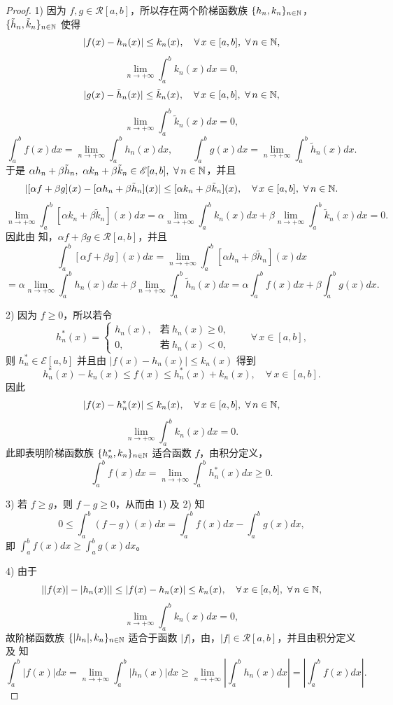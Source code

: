 \begin{proof}

	1) 因为 \(f,g\in\mathscr{R}[a,b]\)，所以存在两个阶梯函数族 \(\{h_n,k_n\}_{n\in\mathbb{N}}\)，\(\{\tilde h_n,\tilde k_n\}_{n\in\mathbb{N}}\) 使得
	\[
	|f(x)-h_n(x)|\le k_n(x),\quad\forall\,x\in[a,b],\ \forall\,n\in\mathbb{N},
	\]
	\[
	\lim_{n\to+\infty}\int_a^b k_n(x)dx=0,
	\]
	\[
	|g(x)-\tilde h_n(x)|\le\tilde k_n(x),\quad\forall\,x\in[a,b],\ \forall\,n\in\mathbb{N},
	\]
	\[
	\lim_{n\to+\infty}\int_a^b\tilde k_n(x)dx=0,
	\]
	\[
	\int_a^b f(x)dx=\lim_{n\to+\infty}\int_a^b h_n(x)dx,\qquad
	\int_a^b g(x)dx=\lim_{n\to+\infty}\int_a^b\tilde h_n(x)dx.
	\]
	于是 \(\alpha h_n+\beta\tilde h_n,\ \alpha k_n+\beta\tilde k_n\in\mathscr{E}[a,b],\ \forall\,n\in\mathbb{N}\)，并且
	\[
	|[\alpha f+\beta g](x)-[\alpha h_n+\beta\tilde h_n](x)|\le[\alpha k_n+\beta\tilde k_n](x),\quad\forall\,x\in[a,b],\ \forall\,n\in\mathbb{N}.
	\]
	\[
	\lim_{n\to+\infty}\int_a^b[\alpha k_n+\beta\tilde k_n](x)dx=\alpha\lim_{n\to+\infty}\int_a^b k_n(x)dx+\beta\lim_{n\to+\infty}\int_a^b\tilde k_n(x)dx=0.
	\]
	因此由 知，\(\alpha f+\beta g\in\mathscr{R}[a,b]\)，并且
	\[
	\int_a^b[\alpha f+\beta g](x)dx=\lim_{n\to+\infty}\int_a^b[\alpha h_n+\beta\tilde h_n](x)dx
	\]
	\[
	=\alpha\lim_{n\to+\infty}\int_a^b h_n(x)dx+\beta\lim_{n\to+\infty}\int_a^b\tilde h_n(x)dx=\alpha\int_a^b f(x)dx+\beta\int_a^b g(x)dx.
	\]

	2) 因为 \(f\ge0\)，所以若令
	\[
	h_n^*(x)=\begin{cases} h_n(x), & \text{若}\ h_n(x)\ge0, \\ 0, & \text{若}\ h_n(x)<0, \end{cases}\qquad\forall\,x\in[a,b],
	\]
	则 \(h_n^*\in\mathscr{E}[a,b]\) 并且由 \(|f(x)-h_n(x)|\le k_n(x)\) 得到
	\[
	h_n^*(x)-k_n(x)\le f(x)\le h_n^*(x)+k_n(x),\quad\forall\,x\in[a,b].
	\]
	因此
	\[
	|f(x)-h_n^*(x)|\le k_n(x),\quad\forall\,x\in[a,b],\ \forall\,n\in\mathbb{N},
	\]
	\[
	\lim_{n\to+\infty}\int_a^b k_n(x)dx=0.
	\]
	此即表明阶梯函数族 \(\{h_n^*,k_n\}_{n\in\mathbb{N}}\) 适合函数 \(f\)，由积分定义，
	\[
	\int_a^b f(x)dx=\lim_{n\to+\infty}\int_a^b h_n^*(x)dx\ge0.
	\]

	3) 若 \(f\ge g\)，则 \(f-g\ge0\)，从而由 1) 及 2) 知
	\[
	0\le\int_a^b(f-g)(x)dx=\int_a^b f(x)dx-\int_a^b g(x)dx,
	\]
	即 \(\displaystyle\int_a^b f(x)dx\ge\int_a^b g(x)dx\)。

	4) 由于
	\[
	||f(x)|-|h_n(x)||\le|f(x)-h_n(x)|\le k_n(x),\quad\forall\,x\in[a,b],\ \forall\,n\in\mathbb{N},
	\]
	\[
	\lim_{n\to+\infty}\int_a^b k_n(x)dx=0,
	\]
	故阶梯函数族 \(\{|h_n|,k_n\}_{n\in\mathbb{N}}\) 适合于函数 \(|f|\)，由，\(|f|\in\mathscr{R}[a,b]\)，并且由积分定义及 知
	\[
	\int_a^b|f(x)|dx=\lim_{n\to+\infty}\int_a^b|h_n(x)|dx\ge\lim_{n\to+\infty}\left|\int_a^b h_n(x)dx\right|=\left|\int_a^b f(x)dx\right|.
	\]

\end{proof}


